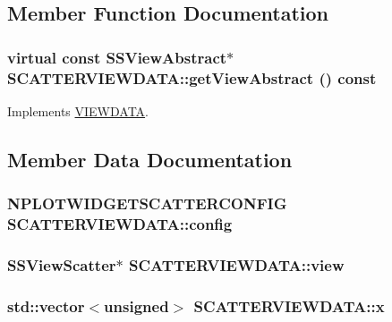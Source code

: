 \subsection{Member Function Documentation}
\hypertarget{class_s_c_a_t_t_e_r_v_i_e_w_d_a_t_a_afd6be79567be97348e6c98094e00596}{
\subsubsection[{getViewAbstract}]{\setlength{\rightskip}{0pt plus 5cm}virtual const SSViewAbstract$\ast$ SCATTERVIEWDATA::getViewAbstract () const}}
\label{class_s_c_a_t_t_e_r_v_i_e_w_d_a_t_a_afd6be79567be97348e6c98094e00596}




Implements \hyperlink{class_v_i_e_w_d_a_t_a_1b4cca271e32b8d47b615e75dbf0624e}{VIEWDATA}.

\subsection{Member Data Documentation}
\hypertarget{class_s_c_a_t_t_e_r_v_i_e_w_d_a_t_a_bcc7e15480842b30a29e8cddef6812e9}{
\subsubsection[{config}]{\setlength{\rightskip}{0pt plus 5cm}NPLOTWIDGETSCATTERCONFIG {\bf SCATTERVIEWDATA::config}}}
\label{class_s_c_a_t_t_e_r_v_i_e_w_d_a_t_a_bcc7e15480842b30a29e8cddef6812e9}


\hypertarget{class_s_c_a_t_t_e_r_v_i_e_w_d_a_t_a_856bee6d011d630e10fdb5429cb0a2b0}{
\subsubsection[{view}]{\setlength{\rightskip}{0pt plus 5cm}SSViewScatter$\ast$ {\bf SCATTERVIEWDATA::view}}}
\label{class_s_c_a_t_t_e_r_v_i_e_w_d_a_t_a_856bee6d011d630e10fdb5429cb0a2b0}


\hypertarget{class_s_c_a_t_t_e_r_v_i_e_w_d_a_t_a_4fc4bda1633e9e58b3d2317a16a01f82}{
\subsubsection[{x}]{\setlength{\rightskip}{0pt plus 5cm}std::vector$<$unsigned$>$ {\bf SCATTERVIEWDATA::x}}}
\label{class_s_c_a_t_t_e_r_v_i_e_w_d_a_t_a_4fc4bda1633e9e58b3d2317a16a01f82}



